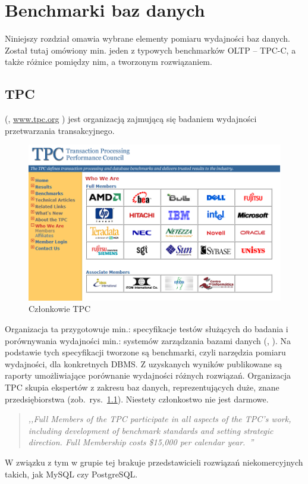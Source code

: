 \chapter{Benchmarki baz danych}\label{chap:teo}

Niniejszy rozdział omawia wybrane elementy pomiaru wydajności baz danych. Został tutaj 
omówiony min. jeden z typowych benchmarków OLTP -- TPC-C, a także różnice pomiędzy nim, 
a tworzonym rozwiązaniem.

\section{TPC}
 (, \url{www.tpc.org} ) jest 
organizacją zajmującą się badaniem wydajności przetwarzania transakcyjnego.
\begin{figure}[t]
\begin{center}
\includegraphics[width=0.8\linewidth]{figures/tpc/tpc_members.png}
\end{center}
\caption{Członkowie TPC~\cite{TPC1}}\label{rys:tpc_members}
\end{figure}
Organizacja ta przygotowuje min.: specyfikacje testów służących do badania i porównywania wydajności min.: 
systemów zarządzania bazami danych (, ). Na podstawie tych specyfikacji tworzone są benchmarki, 
czyli narzędzia pomiaru wydajności, dla konkretnych DBMS. Z uzyskanych wyników publikowane są raporty 
umożliwiające porównanie wydajności różnych rozwiązań. Organizacja TPC skupia ekspertów z zakresu baz danych, reprezentujących
duże, znane przedsiębiorstwa (zob.~rys.~\ref{rys:tpc_members}). Niestety członkostwo nie jest darmowe.
\begin{quote}\textit{,,Full Members of the TPC participate in all aspects of the TPC's work, including 
development of benchmark standards and setting strategic direction. 
Full Membership costs \$15,000 per calendar year.~\cite{TPC1}''} \end{quote} 
W związku z tym w grupie tej brakuje przedstawicieli rozwiązań niekomercyjnych takich, jak
MySQL czy PostgreSQL.

